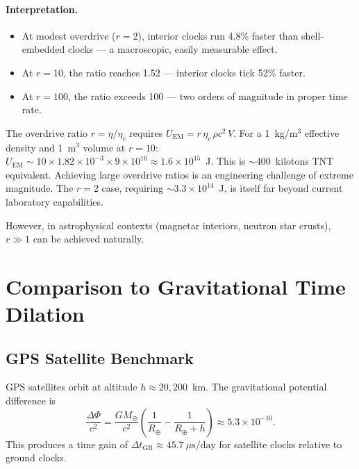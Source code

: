 \documentclass[aps,prd,twocolumn,superscriptaddress,nofootinbib]{revtex4-2}
\begin{document}
\paragraph{Interpretation.}
\begin{itemize}
\item At modest overdrive ($r = 2$), interior clocks run 4.8\% faster than shell-embedded clocks --- a macroscopic, easily measurable effect.
\item At $r = 10$, the ratio reaches 1.52 --- interior clocks tick 52\% faster.
\item At $r = 100$, the ratio exceeds 100 --- two orders of magnitude in proper time rate.
\end{itemize}

\begin{tcolorbox}[colback=yellow!5!white, colframe=yellow!60!black, title=Caveat: Energy Requirements]
The overdrive ratio $r = \eta/\eta_c$ requires $U_{\mathrm{EM}} = r\,\eta_c\,\rho c^2\,V$.  For a 1~kg/m$^3$ effective density and 1~m$^3$ volume at $r = 10$: $U_{\mathrm{EM}} \sim 10 \times 1.82 \times 10^{-3} \times 9 \times 10^{16} \approx 1.6 \times 10^{15}$~J.  This is $\sim$400~kilotons TNT equivalent.  Achieving large overdrive ratios is an engineering challenge of extreme magnitude.  The $r = 2$ case, requiring $\sim 3.3 \times 10^{14}$~J, is itself far beyond current laboratory capabilities.

However, in astrophysical contexts (magnetar interiors, neutron star crusts), $r \gg 1$ can be achieved naturally.
\end{tcolorbox}

\section{Comparison to Gravitational Time Dilation}\label{sec:comparison}

\subsection{GPS Satellite Benchmark}

GPS satellites orbit at altitude $h \approx 20{,}200$~km.  The gravitational potential difference is
\begin{equation}
\frac{\Delta\Phi}{c^2} = \frac{GM_\oplus}{c^2}\!\left(\frac{1}{R_\oplus} - \frac{1}{R_\oplus + h}\right) \approx 5.3 \times 10^{-10}.
\end{equation}
This produces a time gain of $\Delta t_{\mathrm{GR}} \approx 45.7~\mu\text{s/day}$ for satellite clocks relative to ground clocks.
\end{document}
